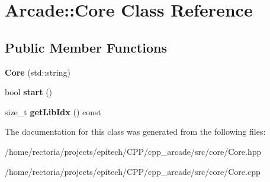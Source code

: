 \hypertarget{class_arcade_1_1_core}{}\section{Arcade\+:\+:Core Class Reference}
\label{class_arcade_1_1_core}
\subsection*{Public Member Functions}
\begin{DoxyCompactItemize}
\item 
\mbox{\label{class_arcade_1_1_core_a3aff95ff6b2845429d312ced005703e3}} 
{\bfseries Core} (std\+::string)
\item 
\mbox{\label{class_arcade_1_1_core_a8ec42bea864c79951f0536f45c61c48c}} 
bool {\bfseries start} ()
\item 
\mbox{\label{class_arcade_1_1_core_ae32b27d7fd09df11138acf600a7a1a53}} 
size\+\_\+t {\bfseries get\+Lib\+Idx} () const
\end{DoxyCompactItemize}


The documentation for this class was generated from the following files\+:\begin{DoxyCompactItemize}
\item 
/home/rectoria/projects/epitech/\+C\+P\+P/cpp\+\_\+arcade/src/core/Core.\+hpp\item 
/home/rectoria/projects/epitech/\+C\+P\+P/cpp\+\_\+arcade/src/core/Core.\+cpp\end{DoxyCompactItemize}
